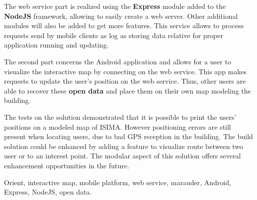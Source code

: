 The web service part is realized using the \textbf{Express} module added to the \textbf{NodeJS} framework, allowing to easily create a web server. Other additional modules will also be added to get more features. This service allows to process requests send by mobile clients as log as storing data relative for proper application running and updating.

The second part concerns the Android application and allows for a user to visualize the interactive map by connecting on the web service. This app makes requests to update the user's position on the web service. Thus, other users are able to recover these \textbf{open data} and place them on their own map modeling the building.

The tests on the solution demonstrated that it is possible to print the users' positions on a modeled map of ISIMA. However positioning errors are still present when locating users, due to bad GPS reception in the building. The build solution could be enhanced by adding a feature to visualize route between two user or to an interest point. The modular aspect of this solution offers several enhancement opportunities in the future.

Orient, interactive map, mobile platform, web service, marauder, Android, Express, NodeJS, open data.



